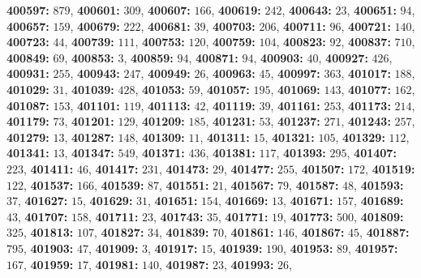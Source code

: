 \textsf{\bfseries 400597:} $879$, \textsf{\bfseries 400601:} $309$, \textsf{\bfseries 400607:} $166$, \textsf{\bfseries 400619:} $242$, \textsf{\bfseries 400643:} $23$, \textsf{\bfseries 400651:} $94$, \textsf{\bfseries 400657:} $159$, \textsf{\bfseries 400679:} $222$, \textsf{\bfseries 400681:} $39$, \textsf{\bfseries 400703:} $206$, \textsf{\bfseries 400711:} $96$, \textsf{\bfseries 400721:} $140$, \textsf{\bfseries 400723:} $44$, \textsf{\bfseries 400739:} $111$, \textsf{\bfseries 400753:} $120$, \textsf{\bfseries 400759:} $104$, \textsf{\bfseries 400823:} $92$, \textsf{\bfseries 400837:} $710$, \textsf{\bfseries 400849:} $69$, \textsf{\bfseries 400853:} $3$, \textsf{\bfseries 400859:} $94$, \textsf{\bfseries 400871:} $94$, \textsf{\bfseries 400903:} $40$, \textsf{\bfseries 400927:} $426$, \textsf{\bfseries 400931:} $255$, \textsf{\bfseries 400943:} $247$, \textsf{\bfseries 400949:} $26$, \textsf{\bfseries 400963:} $45$, \textsf{\bfseries 400997:} $363$, \textsf{\bfseries 401017:} $188$, \textsf{\bfseries 401029:} $31$, \textsf{\bfseries 401039:} $428$, \textsf{\bfseries 401053:} $59$, \textsf{\bfseries 401057:} $195$, \textsf{\bfseries 401069:} $143$, \textsf{\bfseries 401077:} $162$, \textsf{\bfseries 401087:} $153$, \textsf{\bfseries 401101:} $119$, \textsf{\bfseries 401113:} $42$, \textsf{\bfseries 401119:} $39$, \textsf{\bfseries 401161:} $253$, \textsf{\bfseries 401173:} $214$, \textsf{\bfseries 401179:} $73$, \textsf{\bfseries 401201:} $129$, \textsf{\bfseries 401209:} $185$, \textsf{\bfseries 401231:} $53$, \textsf{\bfseries 401237:} $271$, \textsf{\bfseries 401243:} $257$, \textsf{\bfseries 401279:} $13$, \textsf{\bfseries 401287:} $148$, \textsf{\bfseries 401309:} $11$, \textsf{\bfseries 401311:} $15$, \textsf{\bfseries 401321:} $105$, \textsf{\bfseries 401329:} $112$, \textsf{\bfseries 401341:} $13$, \textsf{\bfseries 401347:} $549$, \textsf{\bfseries 401371:} $436$, \textsf{\bfseries 401381:} $117$, \textsf{\bfseries 401393:} $295$, \textsf{\bfseries 401407:} $223$, \textsf{\bfseries 401411:} $46$, \textsf{\bfseries 401417:} $231$, \textsf{\bfseries 401473:} $29$, \textsf{\bfseries 401477:} $255$, \textsf{\bfseries 401507:} $172$, \textsf{\bfseries 401519:} $122$, \textsf{\bfseries 401537:} $166$, \textsf{\bfseries 401539:} $87$, \textsf{\bfseries 401551:} $21$, \textsf{\bfseries 401567:} $79$, \textsf{\bfseries 401587:} $48$, \textsf{\bfseries 401593:} $37$, \textsf{\bfseries 401627:} $15$, \textsf{\bfseries 401629:} $31$, \textsf{\bfseries 401651:} $154$, \textsf{\bfseries 401669:} $13$, \textsf{\bfseries 401671:} $157$, \textsf{\bfseries 401689:} $43$, \textsf{\bfseries 401707:} $158$, \textsf{\bfseries 401711:} $23$, \textsf{\bfseries 401743:} $35$, \textsf{\bfseries 401771:} $19$, \textsf{\bfseries 401773:} $500$, \textsf{\bfseries 401809:} $325$, \textsf{\bfseries 401813:} $107$, \textsf{\bfseries 401827:} $34$, \textsf{\bfseries 401839:} $70$, \textsf{\bfseries 401861:} $146$, \textsf{\bfseries 401867:} $45$, \textsf{\bfseries 401887:} $795$, \textsf{\bfseries 401903:} $47$, \textsf{\bfseries 401909:} $3$, \textsf{\bfseries 401917:} $15$, \textsf{\bfseries 401939:} $190$, \textsf{\bfseries 401953:} $89$, \textsf{\bfseries 401957:} $167$, \textsf{\bfseries 401959:} $17$, \textsf{\bfseries 401981:} $140$, \textsf{\bfseries 401987:} $23$, \textsf{\bfseries 401993:} $26$, 
